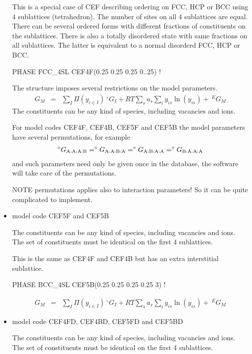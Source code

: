 \documentclass[12pt]{article}
\begin{document}
\begin{itemize}
  This is a special case of CEF describing ordering on FCC, HCP or BCC
  using 4 sublattices (tetrahedron).  The number of sites on all 4
  sublattices are equal.  There can be several ordered forms with
  different fractions of constituents on the sublattices.  There is
  also a totally disordered state with same fractions on all
  sublattices.  The latter is equivalent to a normal disorderd FCC,
  HCP or BCC.

  PHASE FCC\_4SL CEF4F(0.25 0.25 0.25 0..25) !

  The structure imposes several restrictions on the model parameters.
  \begin{eqnarray}
    G_M &=& \sum_I \Pi(y_{i\in I}) ~^{\circ}G_I + RT \sum_s a_s \sum_i y_{is}\ln(y_{is}) + ~^EG_M
  \end{eqnarray}
  The constituents can be any kind of species, including vacancies and
  ions.

  For model codes CEF4F, CEF4B, CEF5F and CEF5B the model parameters
  have several permutations, for example
  \begin{eqnarray}
    ^{\circ}G_{\rm A:A:A:B}=^{\circ}G_{\rm A:A:B:A}=^{\circ}G_{\rm A:B:A:A}=^{\circ}G_{\rm B:A:A:A}
  \end{eqnarray}
  and such parameters need only be given once in the database, the
  software will take care of the permutations.

  NOTE permutations applies also to interaction parameters!  So it can
  be quite complicated to implement.


\item model code CEF5F and CEF5B 

  The constituents can be any kind of species, including vacancies and
  ions.  The set of constituents must be identical on the first 4
  sublattices.

  This is the same as CEF4F and CEF4B but has an extra interstitial
  sublattice.

  PHASE BCC\_4SL CEF5B(0.25 0.25 0.25 0.25 3) ! 

  \begin{eqnarray}
    G_M &=& \sum_I \Pi(y_{i\in I}) ~^{\circ}G_I + RT \sum_s a_s\sum_i y_{is}\ln(y_{is}) + ~^EG_M
  \end{eqnarray}

\item model code CEF4FD, CEF4BD, CEF5FD and CEF5BD

  The constituents can be any kind of species, including vacancies and
  ions.  The set of constituents must be identical on the first 4
  sublattices.


\end{itemize}
\end{document}
